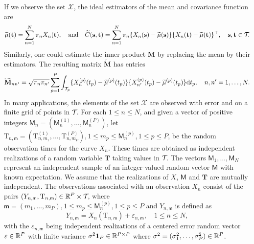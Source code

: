 If we observe the set $\mathcal{X}$, the ideal estimators of the mean and covariance function are
\begin{equation}\label{eq:perfect_estimator}
    \widetilde{\mu}(\mathbf{t}) = \sum_{n = 1}^N \pi_n X_n(\mathbf{t}), \quad\text{and}\quad \widetilde{C}(\mathbf{s}, \mathbf{t}) =  \sum_{n = 1}^N \pi_n \{X_n(\mathbf{s}) - \widetilde{\mu}(\mathbf{s})\}\{X_n(\mathbf{t}) - \widetilde{\mu}(\mathbf{t})\}^\top, \quad \mathbf{s}, \mathbf{t} \in \mathcal{T}_{}.
\end{equation}
Similarly, one could estimate the inner-product $\mathbf{M}$ by replacing the mean by their estimators. The resulting matrix $\widetilde{\mathbf{M}}$ has entries
\begin{equation}\label{eq:perfect_gram_estimator}
    \widetilde{\mathbf{M}}_{nn^\prime} = \sqrt{\pi_n \pi_{n^{\prime}}}\sum_{p = 1}^P \int_{\mathcal{T}_{p}}\{X_n^{(p)}(t_p) - \widetilde{\mu}^{(p)}(t_p)\}\{X_{n^\prime}^{(p)}(t_p) - \widetilde{\mu}^{(p)}(t_p)\} {\rm d} t_p, \quad n, n^\prime = 1, \dots, N.
\end{equation}
In many applications, the elements of the set $\mathcal{X}$ are observed with error and on a finite grid of points in $\mathcal{T}_{}$. For each $1 \leq n \leq N$, and given a vector of positive integers $\mathsf{M}_n = (\mathsf{M}_n^{(1)}, \dots, \mathsf{M}_n^{(P)})$, let $\mathrm{T}_{n, \mathsf{m}} = (\mathrm{T}_{n, m_1}^{(1)}, \dots, \mathrm{T}_{n, m_P}^{(P)}), 1 \leq m_p \leq \mathsf{M}_n^{(p)}, 1 \leq p \leq P$, be the random observation times for the curve $X_n$. These times are obtained as independent realizations of a random variable $\mathbf{T}$ taking values in $\mathcal{T}_{}$. The vectors $\mathsf{M}_1, \dots, \mathsf{M}_N$ represent an independent sample of an integer-valued random vector $\mathsf{M}$ with known expectation. We assume that the realizations of $X$, $\mathsf{M}$ and $\mathbf{T}$ are mutually independent. The observations associated with an observation $X_n$ consist of the pairs $(Y_{n, \mathsf{m}}, \mathrm{T}_{n, \mathsf{m}}) \in \mathbb{R}^P \times \mathcal{T}_{}$, where $\mathsf{m} = (m_1, \dots, m_P), 1 \leq m_p \leq \mathsf{M}_n^{(p)}, 1 \leq p \leq P$ and $Y_{n, \mathsf{m}}$ is defined as
\begin{equation}\label{eq:model_error}
    Y_{n, \mathsf{m}} = X_n(\mathrm{T}_{n, \mathsf{m}}) + \varepsilon_{n, \mathsf{m}}, \quad 1 \leq n \leq N,
\end{equation}
with the $\varepsilon_{n, \mathsf{m}}$ being independent realizations of a centered error random vector $\varepsilon \in \mathbb{R}^{P}$ with finite variance $\sigma^2\mathbf{1}_P \in \mathbb{R}^{P \times P}$ where $\sigma^2 = (\sigma^2_1, \dots, \sigma^2_P) \in \mathbb{R}^{P}$.

